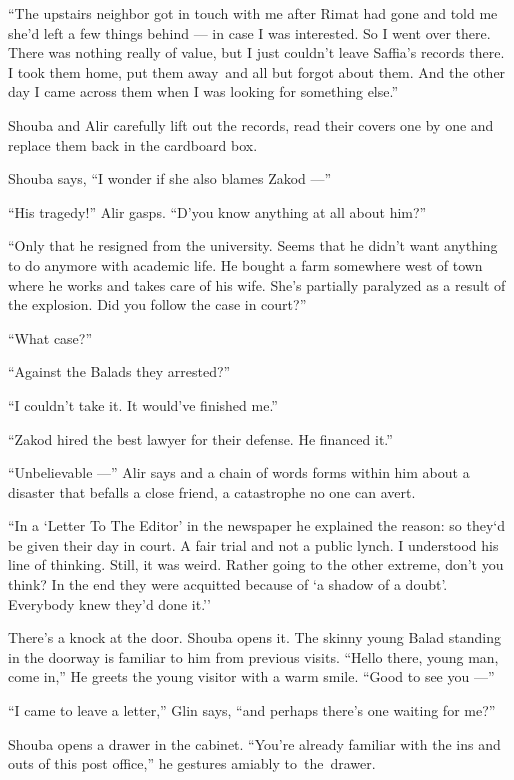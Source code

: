 \documentclass[twoside,11pt]{book}
\begin{document}
``The upstairs neighbor got in touch with me after Rimat had gone and told me she'd left a few things
behind --- in case I was interested. So I went over there. There was nothing really of value, but I just couldn't leave
Saffia's records there. I took them home, put them away~and all but forgot about them. And the other day I came across
them when I was looking for something else.''

Shouba and Alir carefully lift out the records, read their covers one by one and replace them back in the cardboard
box.

Shouba says, ``I wonder if she also blames Zakod ---''

``His tragedy!'' Alir gasps. ``D'you know anything at all about
him?''

``Only that he resigned from the university. Seems that he didn't want
anything to do anymore with academic life. He
bought a farm somewhere west of town where he works and takes care of his wife. She's partially paralyzed as a result
of the explosion. Did you follow the case in court?''

``What case?''

``Against the Balads they arrested?''

``I couldn't take it. It would've finished me.''

``Zakod hired the best lawyer for their defense. He financed it.''

``Unbelievable ---'' Alir says and a chain of words forms within him about a disaster that
befalls a close friend, a catastrophe no one can avert.

``In a `Letter To The Editor' in the newspaper he explained the reason: so they`d be given their day
in court. A fair trial and not a public lynch. I understood his line of thinking. Still, it was weird. Rather going to
the other extreme, don't you think?{  }In the end they were acquitted because
of `a shadow of a doubt'. Everybody knew they'd done it.''

There's a knock at the door. Shouba opens it. The skinny young Balad standing in the doorway is familiar to him from
previous visits. ``Hello there, young man, come in,'' He greets the young visitor with a
warm smile. ``Good to see you ---''

``I came to leave a letter,'' Glin says, ``and perhaps there's one waiting for
me?''

Shouba opens a drawer in the cabinet. ``You're already familiar with the ins and outs of this post
office,'' he gestures amiably to~the~drawer.
\end{document}
